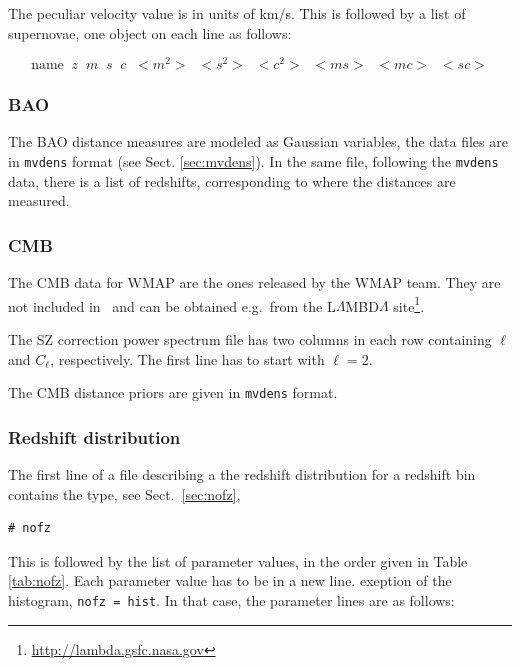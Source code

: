 \documentclass[11pt, chapterprefix, headsepline]{scrartcl}
\begin{document}
\begin{appendix}
The peculiar velocity value is in units of km/s.
This is followed by a list of supernovae, one object on each line as
follows:

$$\mbox{name} \;\; z \;\; m \;\; s \;\; c \;\; <m^2> \;\; <s^2>
\;\; <c^2> \;\; <ms> \;\; <mc> \;\; <sc>$$


\subsubsection{BAO}

The BAO distance measures are modeled as Gaussian variables, the data
files are in \texttt{mvdens} format (see Sect. \ref{sec:mvdens}). In the same
file, following the \texttt{mvdens} data, there is a list of
redshifts, corresponding to where the distances are measured.

\subsubsection{CMB}

The CMB data for WMAP are the ones released by  the WMAP team. They
are not included in \CosmoPMC\ and can be obtained e.g.\ from the
L$\Lambda$MBD$\Lambda$
site\footnote{\url{http://lambda.gsfc.nasa.gov}}.

The SZ correction power spectrum file has two columns in each row
containing $\ell$ and $C_\ell$, respectively. The first line has to
start with $\ell = 2$.

The CMB distance priors \citep{WMAP5-Komatsu08} are given in
\texttt{mvdens} format.


\subsubsection{Redshift distribution}
\label{sec:nofz_file}


The first line of a file describing a the redshift distribution for a
redshift bin contains the type, see Sect.~\ref{sec:nofz},
\begin{verbatim}
# nofz
\end{verbatim}
This is followed by the list of parameter values, in the order given in Table
\ref{tab:nofz}. Each parameter value has to be in a new line.
exeption of the histogram, \texttt{nofz = hist}. In that case, the
parameter lines are as follows:


\end{appendix}
\end{document}
